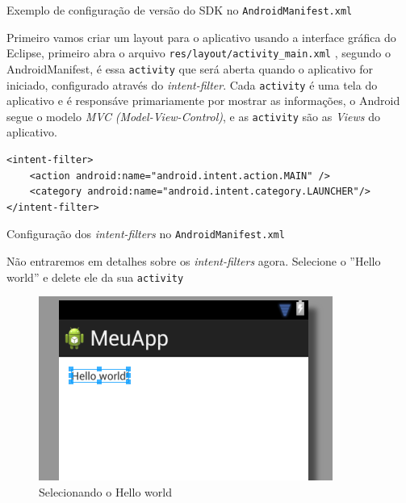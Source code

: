\documentclass[a4paper,12pt,brazil,doubleside]{book}
\begin{document}
\begin{singlespace}
\begin{listing}[H]
\inputminted[linenos=true,fontsize=\small,frame=lines, framesep=2mm, tabsize=2,numbersep=5pt]{xml}{../../src/android/firstapp/sdk-manifest.xml}
\label{AndroidManifest.sdk}
\caption{Exemplo de configuração de versão do SDK no \texttt{\textcolor{mygreen}{AndroidManifest.xml}} }
\end{listing}

Primeiro vamos criar um layout para o aplicativo usando a interface gráfica do Eclipse, primeiro abra o arquivo \texttt{\textcolor{mygreen}{res/layout/activity\_main.xml}} , segundo o AndroidManifest, é essa \texttt{activity} que será aberta quando o aplicativo for iniciado, configurado através do \textit{intent-filter}. Cada \texttt{activity} é uma tela do aplicativo e é responsáve primariamente por mostrar as informações, o Android segue o modelo \emph{MVC} \textit{(Model-View-Control)}, e as \texttt{activity} são as \textit{Views} do aplicativo.
\begin{listing}
\begin{verbatim}
<intent-filter>
	<action android:name="android.intent.action.MAIN" />
	<category android:name="android.intent.category.LAUNCHER"/>
</intent-filter>
\end{verbatim}
\caption{Configuração dos \textit{intent-filters} no \texttt{\textcolor{mygreen}{AndroidManifest.xml}} }
\end{listing}

Não entraremos em detalhes sobre os \textit{intent-filters} agora. Selecione o ''Hello world'' e delete ele da sua \texttt{activity}

\begin{figure}[H]
  \centering
  \includegraphics{figuras/3-criando-app.png}
  \caption{Selecionando o Hello world}
  \label{fig:b}
\end{figure}


\end{singlespace}
\end{document}
